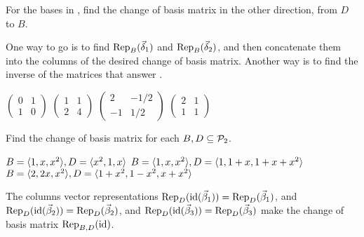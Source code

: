 \begin{exercises}
\begin{answer}
    \end{answer}
  \item 
    For the bases in , 
    find the change of basis matrix in the other direction, from $D$ to $B$.
    \begin{answer}
       One way to go is to find 
       $\rep{\vec{\delta}_1}{B}$ and $\rep{\vec{\delta}_2}{B}$,
       and then concatenate them into the columns of the desired 
       change of basis matrix.
       Another way is to find the inverse of the matrices that answer
       . 
       \begin{exparts*}
        \partsitem
          $\begin{pmatrix}
            0  &1  \\
            1  &0
          \end{pmatrix}$
        \partsitem \( \begin{pmatrix}
            1  &1  \\
            2  &4
          \end{pmatrix} \)
        \partsitem \( \begin{pmatrix}
            2  &-1/2  \\
            -1 &1/2
          \end{pmatrix} \)
        \partsitem \( \begin{pmatrix}
            2  &1  \\
            1  &1
          \end{pmatrix} \)
      \end{exparts*} 
    \end{answer}
  \recommended \item
    Find the change of basis matrix for each \( B,D\subseteq\polyspace_2 \).
    \begin{exparts*}
      \partsitem \( B=\sequence{1,x,x^2},
               D=\sequence{x^2,1,x} \)
      \partsitem \( B=\sequence{1,x,x^2},
               D=\sequence{1,1+x,1+x+x^2} \)
      \partsitem \( B=\sequence{2,2x,x^2},
               D=\sequence{1+x^2,1-x^2,x+x^2} \)
    \end{exparts*}
    \begin{answer}
      The columns vector representations
      $\rep{\identity(\vec{\beta}_1)}{D}=\rep{\vec{\beta}_1}{D}$,
      and $\rep{\identity(\vec{\beta}_2)}{D}=\rep{\vec{\beta}_2}{D}$,
      and $\rep{\identity(\vec{\beta}_3)}{D}=\rep{\vec{\beta}_3}{D}$
      make the change of basis matrix
      $\rep{\identity}{B,D}$.

\end{answer}
\end{exercises}
